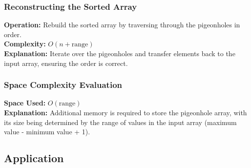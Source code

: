 \subsubsection{Reconstructing the Sorted Array}
\textbf{Operation:} Rebuild the sorted array by traversing through the pigeonholes in order. \\
\textbf{Complexity:} \(O(n + \text{range})\) \\
\textbf{Explanation:} Iterate over the pigeonholes and transfer elements back to the input array, ensuring the order is correct.

\subsubsection{Space Complexity Evaluation}
\textbf{Space Used:} \(O(\text{range})\) \\
\textbf{Explanation:} Additional memory is required to store the pigeonhole array, with its size being determined by the range of values in the input array (maximum value - minimum value + 1).

\subsection{Application}

